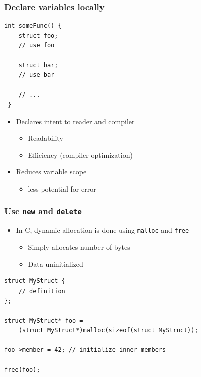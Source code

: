 \documentclass[table]{beamer}
\newcounter{rulecount}
\newcommand{\declarerule}{\textbf{\color{themeblue}{Rule \therulecount:}} }
\begin{document}
\begin{frame}[fragile]
    \frametitle{\declarerule Declare variables locally}
    \begin{lstlisting}[title=In C++ variables can be declared in the middle of scope where they are used]
int someFunc() {
    struct foo;
    // use foo

    struct bar;
    // use bar

    // ...
 }
    \end{lstlisting}
    \begin{itemize}
        \item Declares intent to reader and compiler
            \begin{itemize}
                \item \alert{Readability}
                \item \alert{Efficiency} (compiler optimization)
            \end{itemize}
        \item Reduces variable scope
            \begin{itemize}
                \item less potential for error
            \end{itemize}
    \end{itemize}
\end{frame}

\begin{frame}[fragile]
    \frametitle{\declarerule Use \texttt{new} and \texttt{delete} }
    \begin{itemize}
        \item In C, dynamic allocation is done using \texttt{malloc} and \texttt{free}
            \begin{itemize}
                \item Simply allocates number of bytes
                \item Data uninitialized
            \end{itemize}
    \end{itemize}
    \begin{lstlisting}[title=Dynamically allocating a struct in C]
struct MyStruct {
    // definition
};

struct MyStruct* foo =
    (struct MyStruct*)malloc(sizeof(struct MyStruct));

foo->member = 42; // initialize inner members

free(foo);
    \end{lstlisting}
\end{frame}
\end{document}
